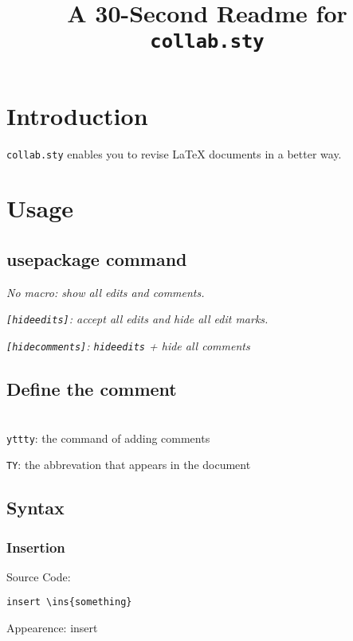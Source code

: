 \documentclass[11pt]{article}
\title{A 30-Second Readme for \texttt{collab.sty}}
\newcommand{\yttty}[1]{\nbc{TY}{#1}{orange}}
\begin{document}
\maketitle

\section{Introduction}

\texttt{collab.sty} enables you to revise \LaTeX\xspace documents in a better way.

\section{Usage}
\subsection{usepackage command}
\noindent\emph{No macro: show all edits and comments.}
\begin{verbatim*}
\usepackage[]{collab}
\end{verbatim*}

\noindent\emph{\texttt{[hideedits]}: accept all edits and hide all edit marks.}
\begin{verbatim*}
\usepackage[hideedits]{collab}
\end{verbatim*}

\noindent\emph{\texttt{[hidecomments]}: \texttt{hideedits} + hide all comments}
\begin{verbatim*}
\usepackage[hidecomments]{collab}
\end{verbatim*}

\subsection{Define the comment}
\noindent\texttt{\\yttty}: the command of adding comments

\noindent\texttt{TY}: the abbrevation that appears in the document

\begin{verbatim*}
\newcommand{\yttty}[1]{\nbc{TY}{#1}{orange}}
\end{verbatim*}

\subsection{Syntax}
\subsubsection{Insertion}
Source Code:
\begin{verbatim}
insert \ins{something}
\end{verbatim}
Appearence: insert 
\end{document}
